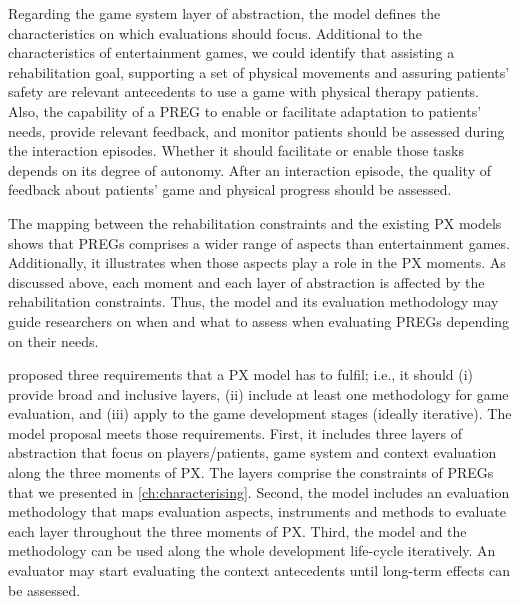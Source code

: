 Regarding the game system layer of abstraction, the model defines the characteristics on which evaluations should focus. Additional to the characteristics of entertainment games, we could identify that assisting a rehabilitation goal, supporting a set of physical movements and assuring patients' safety are relevant antecedents to use a game with physical therapy patients. Also,  the capability of a \ac{PREG} to enable or facilitate adaptation to patients' needs, provide relevant feedback, and monitor patients should be assessed during the interaction episodes. Whether it should facilitate or enable those tasks depends on its degree of autonomy. After an interaction episode, the quality of feedback about patients' game and physical progress should be assessed.

The mapping between the rehabilitation constraints and the existing \ac{PX} models shows that \acp{PREG} comprises a wider range of aspects than entertainment games. Additionally, it illustrates when those aspects play a role in the \ac{PX} moments. As discussed above, each moment and each layer of abstraction is affected by the rehabilitation constraints. Thus, the model and its evaluation methodology may guide researchers on when and what to assess when evaluating \acp{PREG} depending on their needs.

\textcite{Nackea2} proposed three requirements that a \ac{PX} model has to fulfil; i.e., it should (i) provide broad and inclusive layers, (ii) include at least one methodology for game evaluation, and (iii) apply to the game development stages (ideally iterative). The model proposal meets those requirements. First, it includes three layers of abstraction that focus on players/patients, game system and context evaluation along the three moments of \ac{PX}. The layers comprise the constraints of \acp{PREG} that we presented in \autoref{ch:characterising}. Second, the model includes an evaluation methodology that maps evaluation aspects, instruments and methods to evaluate each layer throughout the three moments of \ac{PX}. Third, the model and the methodology can be used along the whole development life-cycle iteratively. An evaluator may start evaluating the context antecedents until long-term effects can be assessed.


